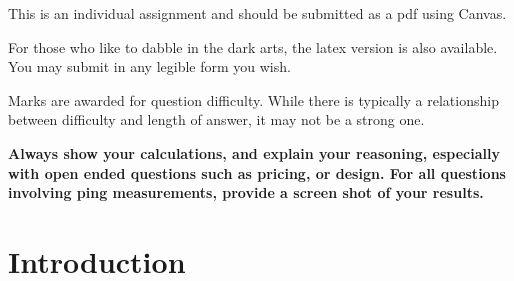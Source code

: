 \documentclass[9pt, addpoints, answers]{exam}
\begin{document}
\large     
\vspace{2cm}
\begin{center}
    \begin{minipage}{40em}
        \begin{center}
            This is an individual assignment and should be submitted as a 
            pdf using Canvas.  
        \end{center}
        
        \vspace{6pt}
    For those who like to dabble in the dark arts, the latex version 
    is also available. You may submit in any legible form you wish.
    
        \vspace{6pt}
    Marks are awarded for question difficulty. While there is 
    typically a relationship between difficulty and length of answer,
        it may not be a strong one. 

        \vspace{6pt}
        \textbf{Always show your calculations, 
        and explain your reasoning, especially with open ended questions 
        such as pricing, or design. For all questions involving ping
        measurements, provide a screen shot of your results.}


    \par
    \vspace{12pt}
    \end{minipage}
\end{center}

\vspace{4cm}
\begin{center}
    \gradetable[h]
\end{center}
\newpage
\section*{Introduction}


\end{document}
